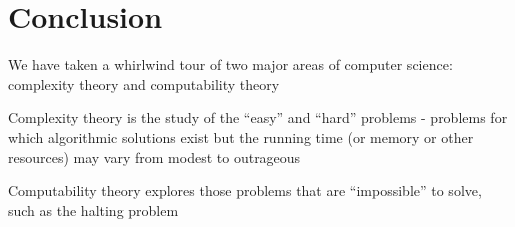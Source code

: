 \documentclass[8pt,a4paper,compress]{beamer}
\begin{document}
\section{Conclusion}
\begin{frame}[fragile]
\pause

We have taken a whirlwind tour of two major areas of computer science: complexity theory and computability theory

\pause
\bigskip

Complexity theory is the study of the ``easy'' and ``hard'' problems - problems for which algorithmic solutions exist but the running time (or memory or other resources) may vary from modest to outrageous

\pause
\bigskip

Computability theory explores those problems that are ``impossible'' to solve, such as the halting problem
\end{frame}
\end{document}

